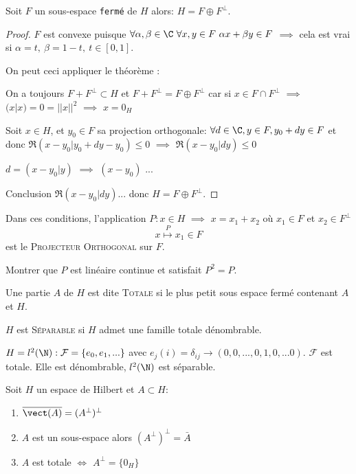 \begin{theorem}[corollaire]
	Soit $F$ un sous-espace \texttt{fermé} de $H$ alors: $H=F\oplus F^\perp$.
\end{theorem}
\begin{proof}
\leavevmode

	$F$ est convexe puisque $\forall \alpha,\beta\in\C\ \forall x, y\in F\ \alpha x+\beta y\in F$ $\implies$ cela est vrai si $\alpha = t,\ \beta=1-t,\ t\in[0,1]$.
	
	On peut ceci appliquer le théorème :
	
	On a toujours $F+F^\perp \subset H$ et $F+F^\perp = F\oplus F^\perp$ car si $x\in F\cap F^\perp$ $\implies$ $(x|x)=0=||x||^2$ $\implies$ $x=0_H$
		
		Soit $x\in H$, et $y_0\in F$ sa projection orthogonale: $\forall d\in \C, y\in F, y_0+dy\in F$ et donc $\Re(x-y_0| y_0+dy-y_0)\leq 0$ $\implies$ $\Re(x-y_0|dy)\leq 0$
		
		$d=(x-y_0|y)$ $\implies$ $(x-y_0)$
		...
		
	Conclusion $\Re(x-y_0|dy)$... donc $H=F\oplus F^\perp$.
\end{proof}

\begin{definition}
	Dans ces conditions, l'application $P:x\in H$ $\implies$ $x=x_1+x_2$ où $x_1\in F$ et $x_2\in F^\perp $
	$$x \overset{P}{\mapsto} x_1\in F$$
	 est le \textsc{Projecteur Orthogonal} sur $F$.
\end{definition}

\begin{example}
	Montrer que $P$ est linéaire continue et satisfait $P^2=P$.
\end{example}

\begin{definition}
	Une partie $A$ de $H$ est dite \textsc{Totale} si le plus petit sous espace fermé contenant $A$ et $H$.

	$H$ est \textsc{Séparable} si $H$ admet une famille totale dénombrable.
\end{definition}

\begin{example}
	$H=l^2(\N): \mathcal{F}=\{e_0, e_1, ...\}$ avec $e_j(i)=\delta_{ij}\to (0,0,..., 0,1,0,... 0)$. $\mathcal{F}$ est totale. Elle est dénombrable, $l^2(\N)$ est séparable.
\end{example}

\begin{theorem}
	Soit $H$ un espace de Hilbert et $A\subset H$:
	\begin{enumerate}
		\item $\overline{\vect(A)}=(A^\perp)^\perp$
		\item $A$ est un sous-espace alors $(A^\perp)^\perp=\bar A$
		\item $A$ est totale $\iff$ $A^\perp=\{0_H\}$
	\end{enumerate}
\end{theorem}

